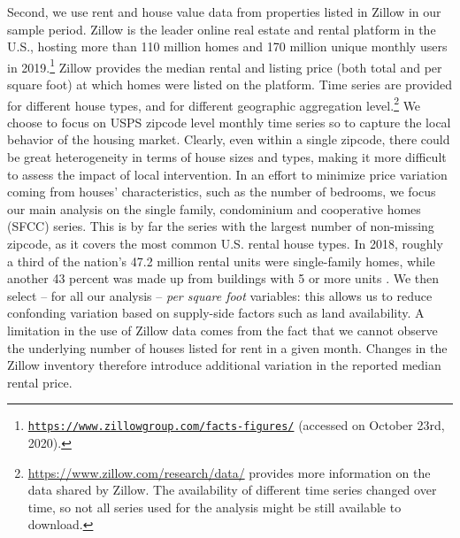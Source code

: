 Second, we use rent and house value data from properties listed in Zillow \parencite{zillow} in our 
sample period. Zillow is the leader online real estate and rental platform in the U.S., hosting more 
than 110 million homes and 170 million unique monthly users in 
2019.\footnote{\href{https://www.zillowgroup.com/facts-figures/}
	{\texttt{https://www.zillowgroup.com/facts-figures/}} (accessed on October 23rd, 2020).}  
Zillow provides the median rental and listing price (both total and per square foot) at which homes 
were listed on the platform. Time series are provided for different house types, and for different 
geographic aggregation level.\footnote{\href{https://www.zillow.com/research/data/}
	{https://www.zillow.com/research/data/} provides more information on the data shared by Zillow. 
	The availability of different time series changed over time, so not all series used for the 
	analysis might be still available to download.} 
We choose to focus on USPS zipcode level monthly time series so to capture the local behavior of the 
housing market. Clearly, even within a single zipcode, there could be great heterogeneity in terms of 
house sizes and types, making it more difficult to assess the impact of local intervention. In an 
effort to minimize price variation coming from houses' characteristics, such as the number of bedrooms, 
we focus our main analysis on the single family, condominium and cooperative homes (SFCC) series. 
This is by far the series with the largest number of non-missing zipcode, as it covers the most 
common U.S. rental house types. In 2018, roughly a third of the nation's 47.2 million rental units 
were single-family homes, while another 43 percent was made up from buildings with 5 or more units 
\parencite{jchs2020rentalreport}. We then select -- for all our analysis -- \textit{per square foot} 
variables: this allows us to reduce confonding variation based on supply-side factors such as land 
availability. A limitation in the use of Zillow data comes from the fact that we cannot observe the 
underlying number of houses listed for rent in a given month. Changes in the Zillow inventory 
therefore introduce additional variation in the reported median rental price.

